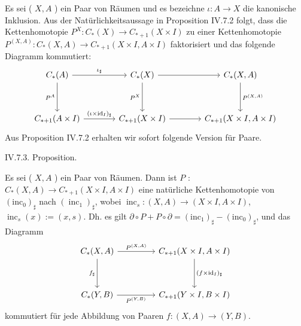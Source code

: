 \documentclass[10pt, letterpaper]{article}
\begin{document}
Es sei ( $X, A$ ) ein Paar von Räumen und es bezeichne $\iota: A \rightarrow X$ die kanonische Inklusion. Aus der Natürlichkeitsaussage in Proposition IV.7.2 folgt, dass die Kettenhomotopie $P^X: C_*(X) \rightarrow C_{*+1}(X \times I)$ zu einer Kettenhomotopie $P^{(X, A)}: C_*(X, A) \rightarrow C_{*+1}(X \times I, A \times I)$ faktorisiert und das folgende Diagramm kommutiert:
\[
\begin{tikzcd}[row sep=3.5em, column sep=3.8em]
C_*(A) \arrow[r, "\iota_{\sharp}"] \arrow[d, "P^A"'] &
C_*(X) \arrow[r] \arrow[d, "P^X"'] &
C_*(X, A) \arrow[d, "P^{(X,A)}"] \\
C_{*+1}(A \times I) \arrow[r, "(\iota \times \mathrm{id}_I)_{\sharp}"] &
C_{*+1}(X \times I) \arrow[r] &
C_{*+1}(X \times I, A \times I)
\end{tikzcd}
\]
Aus Proposition IV.7.2 erhalten wir sofort folgende Version für Paare.


IV.7.3. Proposition. 

Es sei ( $X, A$ ) ein Paar von Räumen. Dann ist $P$ : $C_*(X, A) \rightarrow C_{*+1}(X \times I, A \times I)$ eine natürliche Kettenhomotopie von $\left(\mathrm{inc}_0\right)_{\sharp}$ nach $\left(\operatorname{inc}_1\right)_{\sharp}$, wobei $\operatorname{inc}_s:(X, A) \rightarrow(X \times I, A \times I)$, $\operatorname{inc}_s(x):=(x, s)$. Dh. es gilt $\partial \circ P+P \circ \partial=\left(\mathrm{inc}_1\right)_{\sharp}-\left(\mathrm{inc}_0\right)_{\sharp}$, und das Diagramm
\[
\begin{tikzcd}[row sep=3.5em, column sep=4.5em]
C_*(X, A) \arrow[r, "P^{(X,A)}"] \arrow[d, "f_{\sharp}"'] &
C_{*+1}(X \times I, A \times I) \arrow[d, "(f \times \mathrm{id}_I)_{\sharp}"] \\
C_*(Y, B) \arrow[r, "P^{(Y,B)}"'] &
C_{*+1}(Y \times I, B \times I)
\end{tikzcd}
\]
kommutiert für jede Abbildung von Paaren $f:(X, A) \rightarrow(Y, B)$.
\end{document}
